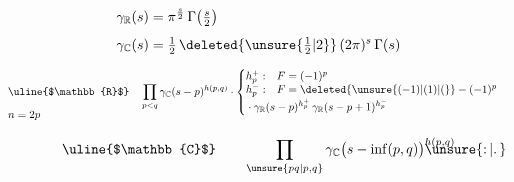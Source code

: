 \[
\begin{aligned}
\gamma_{\mathbb{R}}(s)&=\pi^{\frac{s}{2}}\,\Gamma\bigl(\tfrac{s}{2}\bigr)\\[4pt]
\gamma_{\mathbb{C}}(s)&=\tfrac{1}{2}\,\deleted{\unsure{\tfrac{1}{2}|2}}\,(2\pi)^{s}\,\Gamma(s)
\end{aligned}
\]

\[
\begin{aligned}
&\begin{aligned}[t]
&\text{\uline{$\mathbb{R}$}}\\[6pt]
&n=2p
\end{aligned}
\quad
\prod_{p<q}\gamma_{\mathbb{C}}(s-p)^{h(p,q)}\cdot
\left\{\begin{array}{@{}l@{\quad}l@{}}
h_{p}^{+}: & F=(-1)^{p}\\
h_{p}^{-}: & F=\deleted{\unsure{(-1)|(1)|(}}-(-1)^{p}\\[2pt]
\multicolumn{2}{@{}l@{}}{\displaystyle {}\cdot\gamma_{\mathbb{R}}(s-p)^{h_{p}^{+}}\,\gamma_{\mathbb{R}}(s-p+1)^{h_{p}^{-}}}
\end{array}\right.
\end{aligned}
\]

\[
\text{\uline{$\mathbb{C}$}}\qquad
\prod_{\unsure{pq|p,q}}\gamma_{\mathbb{C}}\bigl(s-\inf(p,q){\bigr)\rlap{\(\unsure{\mathpunct{:}|\mathpunct{.}}\)}}^{h(p,q)}
\]
